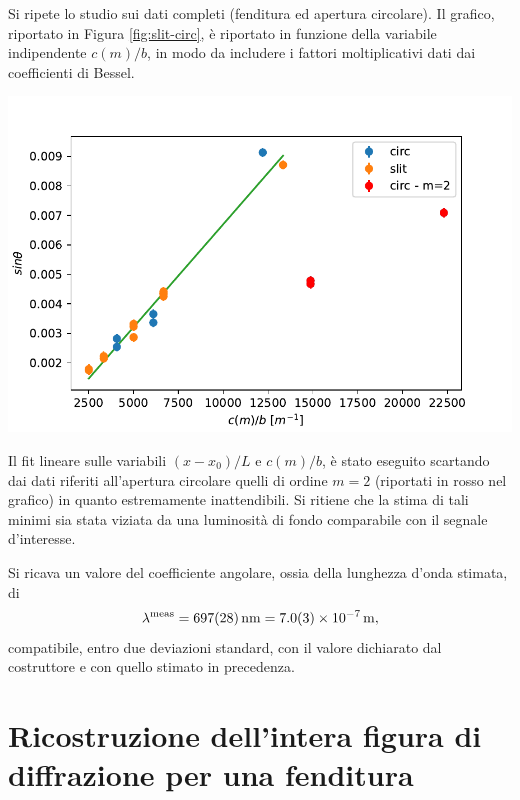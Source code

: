 \documentclass[10pt,oneside,a4paper]{article}
\newenvironment{Figure}
  {\par\medskip\noindent\minipage{\linewidth}}
  {\endminipage\par\medskip}
\begin{document}
\begin{multicols}{2}
Si ripete lo studio sui dati completi (fenditura ed apertura circolare). Il grafico, riportato in Figura \ref{fig:slit-circ}, è riportato in funzione della variabile indipendente $c(m)/b$, in modo da includere i fattori moltiplicativi dati dai coefficienti di Bessel. 
\begin{Figure}
	\begin{center}
	\includegraphics[width=1.1\linewidth]{slit-circ}
	\label{fig:slit-circ}
	\end{center}
\end{Figure}
Il fit lineare sulle variabili  $(x-x_0)/L$ e $c(m)/b$, è stato eseguito scartando dai dati riferiti all'apertura circolare quelli di ordine $m=2$ (riportati in rosso nel grafico) in quanto estremamente inattendibili. Si ritiene che la stima di tali minimi sia stata viziata da una luminosità di fondo comparabile con il segnale d'interesse.

Si ricava un valore del coefficiente angolare, ossia della lunghezza d’onda stimata, di
\[
\lambda^{\text{meas}} = \SI{697 \pm 28}{nm} = \SI{7.0 \pm 0.3 e-7}{m},
\]
compatibile, entro due deviazioni standard, con il valore dichiarato dal costruttore e con quello stimato in precedenza.










\section{Ricostruzione dell'intera figura di diffrazione per una fenditura}\label{sec:figura_di_diffrazione}


\end{multicols}
\end{document}
